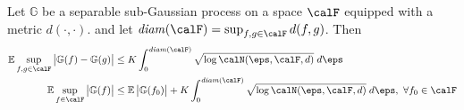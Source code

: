 \begin{theorem}
	\label{thm:vdv2.2.4}
	Let \(\mathbb{G}\) be a separable sub-Gaussian process on a space \(\calF\) equipped with a metric  \(d(\cdot,\cdot)\). and let \(\text{\emph{diam}}(\calF) = \sup_{f,g\in\calF}d(f,g) \). Then
	\begin{align}
		\label{eq:vdv2.2.4-1}
		\E\sup_{f,g\in\calF}\left|\mathbb{G}(f)-\mathbb{G}(g)\right|
		&\leq K \int_{0}^{\text{\emph{diam}}(\calF)} \sqrt{\log \calN(\eps, \calF, d)}\;d\eps \\
		\label{eq:vdv2.2.4-2}
		\E\sup_{f\in\calF}\left|\mathbb{G}(f)\right| &\leq \E\left|\mathbb{G}(f_0)\right| + K \int_{0}^{\text{\emph{diam}}(\calF)} \sqrt{\log \calN(\eps, \calF, d)}\;d\eps,\hbox{ }\forall f_0\in\calF
	\end{align}
\end{theorem}



